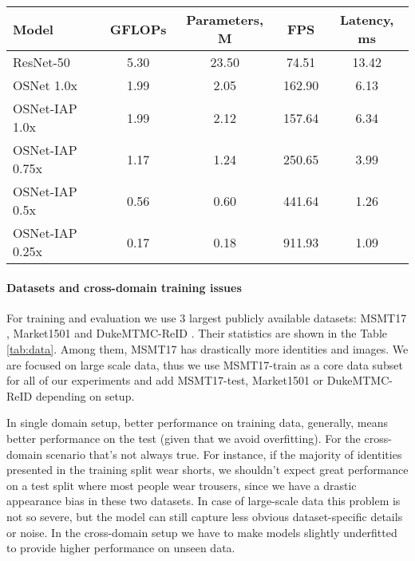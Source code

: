 \documentclass[a4paper,conference]{IEEEtran}
\begin{document}
\begin{table*}
\caption{Performance on the Intel\textregistered  Core\texttrademark i7-6700K 4.00GHz CPU in OpenVINO\texttrademark R3 2019 Toolkit.
         Batch Size is Set to 1, Input Resolution is , Inference Precision is FP32}
\label{tab:perf}
  \centering
  \begin{tabular}{l|c|c|c|c}
    Model & GFLOPs & Parameters, M & FPS & Latency, ms \\ \hline
    ResNet-50 & 5.30 & 23.50 & 74.51 & 13.42 \\
    OSNet 1.0x & 1.99 & 2.05 & 162.90 & 6.13 \\
    OSNet-IAP 1.0x & 1.99 & 2.12 & 157.64 & 6.34 \\
    OSNet-IAP 0.75x & 1.17 & 1.24 & 250.65 & 3.99 \\
    OSNet-IAP 0.5x & 0.56 & 0.60 & 441.64 & 1.26 \\
    OSNet-IAP 0.25x & 0.17 & 0.18 & 911.93 & 1.09 \\
    \hline
  \end{tabular}
\end{table*}

\paragraph{Datasets and cross-domain training issues}

For training and evaluation we use 3 largest publicly available datasets: MSMT17
\cite{MSMT17}, Market1501 \cite{market} and DukeMTMC-ReID \cite{duke, duke2}.
Their statistics are shown in the Table \ref{tab:data}. Among them, MSMT17 has
drastically more identities and images. We are focused on large scale data, thus
we use MSMT17-train as a core data subset for all of our experiments and add
MSMT17-test, Market1501 or DukeMTMC-ReID depending on setup.

In single domain setup, better performance on training data, generally, means
better performance on the test (given that we avoid overfitting). For the
cross-domain scenario that's not always true. For instance, if the majority
of identities presented in the training split wear shorts, we shouldn't expect
great performance on a test split where most people wear trousers, since we have
a drastic appearance bias in these two datasets. In case of large-scale data
this problem is not so severe, but the model can still capture less obvious
dataset-specific details or noise. In the cross-domain setup we have to make
models slightly underfitted to provide higher performance on unseen data.
\end{document}
